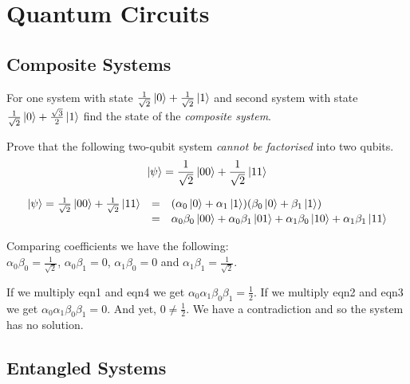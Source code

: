 
\chapter{Quantum Circuits}





\section{Composite Systems}

\begin{example}
For one system with state $\frac{1}{\sqrt{2}} \left|0\right\rangle + \frac{1}{\sqrt{2}} \left|1\right\rangle$
and second system with state $\frac{1}{\sqrt{2}} \left|0\right\rangle + \frac{\sqrt{3}}{2} \left|1\right\rangle$ 
find the state of the \textit{composite system}.
\end{example}


\begin{example}
Prove that the following two-qubit system \textit{cannot be factorised}
into two qubits. 
$$\left|\psi\right\rangle = \frac{1}{\sqrt{2}} \left|00\right\rangle + \frac{1}{\sqrt{2}} \left|11\right\rangle$$
\end{example}

\frmrule

\[ \begin{array}{lll}
\left|\psi\right\rangle = \frac{1}{\sqrt{2}} \left|00\right\rangle + \frac{1}{\sqrt{2}} \left|11\right\rangle 
& = & (\alpha_0 \left|0\right\rangle + \alpha_1 \left|1\right\rangle)(\beta_0 \left|0\right\rangle + \beta_1 \left|1\right\rangle) \\
& = & \alpha_0 \beta_0 \left|00\right\rangle + 
\alpha_0 \beta_1 \left|01\right\rangle + 
\alpha_1 \beta_0 \left|10\right\rangle + 
\alpha_1 \beta_1 \left|11\right\rangle \\
\end{array}\] 

Comparing coefficients we have the following: \\
$\alpha_0 \beta_0 = \frac{1}{\sqrt{2}}$,
$\alpha_0 \beta_1 = 0$,
$\alpha_1 \beta_0 = 0$ and
$\alpha_1 \beta_1 = \frac{1}{\sqrt{2}}$.

If we multiply eqn1 and eqn4 we get $\alpha_0 \alpha_1 \beta_0 \beta_1 = \frac{1}{2}$.
If we multiply eqn2 and eqn3 we get $\alpha_0 \alpha_1 \beta_0 \beta_1 = 0$.
And yet, $0 \neq \frac{1}{2}$. We have a contradiction and so the system has no solution. 



\section{Entangled Systems}



